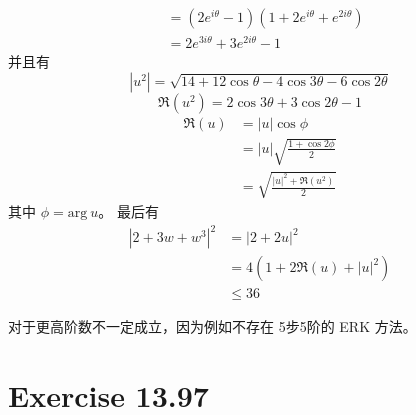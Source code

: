 \documentclass[a4paper]{article}
\begin{document}
\begin{itemize}
\begin{equation}
\begin{aligned}
            &= (2e^{i\theta}-1)(1+2e^{i\theta}+e^{2i\theta}) \\
            &= 2 e^{3i\theta} + 3 e^{2i\theta} -1
        \end{aligned}
    \end{equation}
    并且有
    \begin{equation}
        \left|u^2\right| = 
        \sqrt{
            14+12\cos \theta
        -4\cos 3\theta
        -6\cos 2\theta
        }
    \end{equation}
    \begin{equation}
        \Re(u^2) = 2 \cos 3\theta + 3 \cos 2\theta -1
    \end{equation}
    \begin{equation}
        \begin{aligned}
            \Re(u) &= |u|\cos \phi\\
            &= |u| \sqrt{\frac{1+\cos 2\phi}{2}}\\
            &= \sqrt{\frac{|u|^2+\Re(u^2)}{2}}
        \end{aligned}
    \end{equation}
    其中 $\phi = \text{arg}\ u$。 最后有
    \begin{equation}
        \begin{aligned}
            \left|2 + 3 w + w^3\right| ^2
            &= \left|
                2 + 2 u
            \right|^2 \\
            &= 4\left(
                1 + 2\Re(u) + |u|^2
            \right)\\
            &\leq 36
        \end{aligned}
    \end{equation}
\end{itemize}
\par 对于更高阶数不一定成立，因为例如不存在
5步5阶的 ERK 方法。

\section*{Exercise 13.97}
\end{document}
